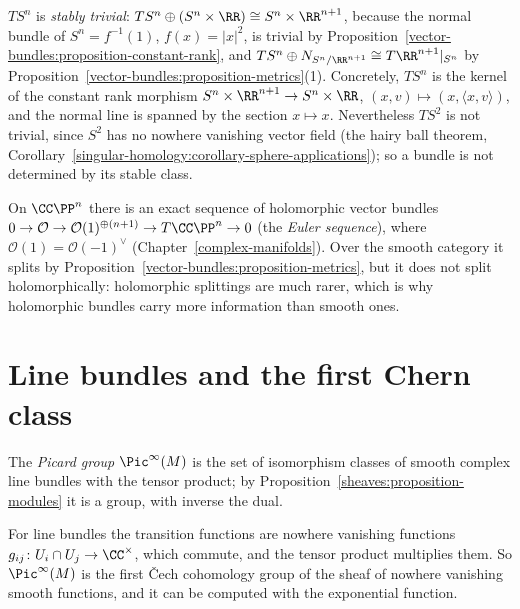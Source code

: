 \begin{example}\label{vector-bundles:example-stably-trivial}
$TS^n$ is \emph{stably trivial}: $TS^n \oplus (S^n \times \RR) \cong S^n \times \RR^{n+1}$, because the normal bundle of $S^n = f^{-1}(1)$, $f(x) = |x|^2$, is trivial by Proposition~\ref{vector-bundles:proposition-constant-rank}, and
$TS^n \oplus N_{S^n/\RR^{n+1}} \cong T\RR^{n+1}|_{S^n}$ by Proposition~\ref{vector-bundles:proposition-metrics}(1). Concretely, $TS^n$ is the kernel of the constant rank morphism
$S^n \times \RR^{n+1} \to S^n \times \RR$, $(x, v) \mapsto (x, \langle x, v\rangle)$, and the normal line is spanned by the section $x \mapsto x$. Nevertheless $TS^2$ is not trivial,
since $S^2$ has no nowhere vanishing vector field (the hairy ball theorem, Corollary~\ref{singular-homology:corollary-sphere-applications}); so a bundle is not determined by its stable class.
\end{example}

\begin{example}\label{vector-bundles:example-euler-sequence}
On $\CC\PP^n$ there is an exact sequence of holomorphic vector bundles
$0 \to \mathcal{O} \to \mathcal{O}(1)^{\oplus(n+1)} \to T\CC\PP^n \to 0$ (the \emph{Euler sequence}), where $\mathcal{O}(1) = \mathcal{O}(-1)^\vee$ (Chapter~\ref{complex-manifolds}). Over the smooth category it
splits by Proposition~\ref{vector-bundles:proposition-metrics}, but it does not split holomorphically: holomorphic splittings are much rarer, which is why holomorphic bundles carry more information than
smooth ones.
\end{example}

\section{Line bundles and the first Chern class}\label{vector-bundles:section-line-bundles}

\begin{definition}\label{vector-bundles:definition-picard}
The \emph{Picard group} $\Pic^\infty(M)$ is the set of isomorphism classes of smooth complex line bundles with the tensor product; by Proposition~\ref{sheaves:proposition-modules} it is a group, with
inverse the dual.
\end{definition}

For line bundles the transition functions are nowhere vanishing functions $g_{ij} \colon U_i \cap U_j \to \CC^\times$, which commute, and the tensor product multiplies them. So
$\Pic^\infty(M)$ is the first \v{C}ech cohomology group of the sheaf of nowhere vanishing smooth functions, and it can be computed with the exponential function.

